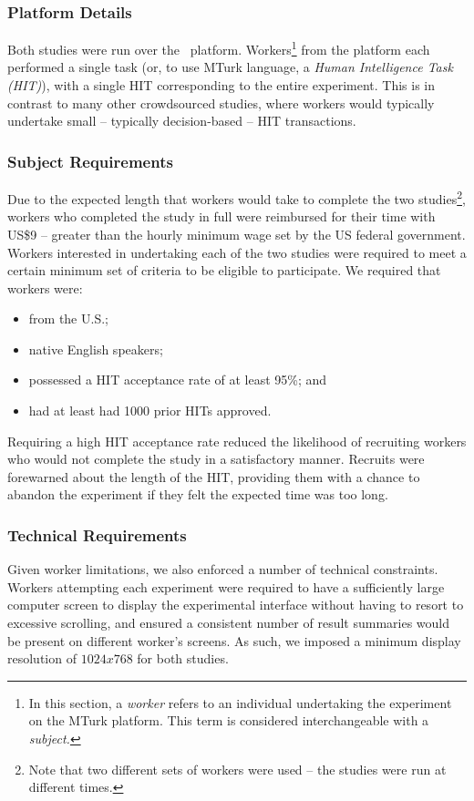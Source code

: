 \subsubsection{Platform Details}\label{sec:methodology:user:crowdsourcing:platform}
Both studies were run over the~ platform. Workers\footnote{In this section, a \emph{worker} refers to an individual undertaking the experiment on the MTurk platform. This term is considered interchangeable with a \emph{subject.}} from the platform each performed a single task (or, to use MTurk language, a \emph{Human Intelligence Task (HIT)}), with a single HIT corresponding to the entire experiment. This is in contrast to many other crowdsourced studies, where workers would typically undertake small -- typically decision-based -- HIT transactions.

\subsubsection{Subject Requirements}\label{sec:methodology:user:crowdsourcing:subjects}
Due to the expected length that workers would take to complete the two studies\footnote{Note that two different sets of workers were used -- the studies were run at different times.}, workers who completed the study in full were reimbursed for their time with US\$9 -- greater than the hourly minimum wage set by the US federal government. Workers interested in undertaking each of the two studies were required to meet a certain minimum set of criteria to be eligible to participate. We required that workers were:

\begin{itemize}
    \item{from the U.S.;}
    \item{native English speakers;}
    \item{possessed a HIT acceptance rate of at least 95\%; and}
    \item{had at least had 1000 prior HITs approved.}
\end{itemize}

Requiring a high HIT acceptance rate reduced the likelihood of recruiting workers who would not complete the study in a satisfactory manner. Recruits were forewarned about the length of the HIT, providing them with a chance to abandon the experiment if they felt the expected time was too long.

\subsubsection{Technical Requirements}\label{sec:methodology:user:crowdsourcing:technical}
Given worker limitations, we also enforced a number of technical constraints. Workers attempting each experiment were required to have a sufficiently large computer screen to display the experimental interface without having to resort to excessive scrolling, and ensured a consistent number of result summaries would be present on different worker's screens. As such, we imposed a minimum display resolution of $1024x768$ for both studies. 

